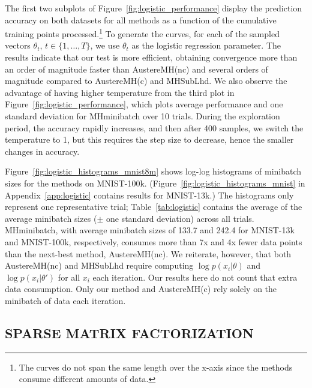 \documentclass[letterpaper]{article}
\begin{document}
The first two subplots of Figure~\ref{fig:logistic_performance} display the
prediction accuracy on both datasets for all methods as a function of the
cumulative training points processed.\footnote{The curves do not span the same
length over the x-axis since the methods consume different amounts of data.} To
generate the curves, for each of the sampled vectors $\theta_t$,
$t\in\{1,\ldots,T\}$, we use $\theta_t$ as the logistic regression parameter.
The results indicate that our test is more efficient, obtaining convergence more
than an order of magnitude faster than {\sc AustereMH(nc)} and several orders of
magnitude compared to {\sc AustereMH(c)} and {\sc MHSubLhd}.  We also observe
the advantage of having higher temperature from the third plot in
Figure~\ref{fig:logistic_performance}, which plots average performance and one
standard deviation for {\sc MHminibatch} over 10 trials. During the exploration
period, the accuracy rapidly increases, and then after 400 samples, we switch
the temperature to 1, but this requires the step size to decrease, hence the
smaller changes in accuracy.

Figure~\ref{fig:logistic_histograms_mnist8m} shows log-log histograms of
minibatch sizes for the methods on MNIST-100k.
(Figure~\ref{fig:logistic_histograms_mnist} in Appendix~\ref{app:logistic}
contains results for MNIST-13k.) The histograms only represent one
representative trial; Table~\ref{tab:logistic} contains the average of the
average minibatch sizes ($\pm$ one standard deviation) across all trials. {\sc
MHminibatch}, with average minibatch sizes of 133.7 and 242.4 for MNIST-13k and
MNIST-100k, respectively, consumes more than 7x and 4x fewer data points than
the next-best method, {\sc AustereMH(nc)}.  We reiterate, however, that both
{\sc AustereMH(nc)} and {\sc MHSubLhd} require computing $\log p(x_i|\theta)$
and $\log p(x_i|\theta')$ for all $x_i$ each iteration. Our results here do not
count that extra data consumption. Only our method and {\sc AustereMH(c)} rely
solely on the minibatch of data each iteration.



\subsection{SPARSE MATRIX FACTORIZATION}\label{ssec:collab_filtering}
\end{document}
